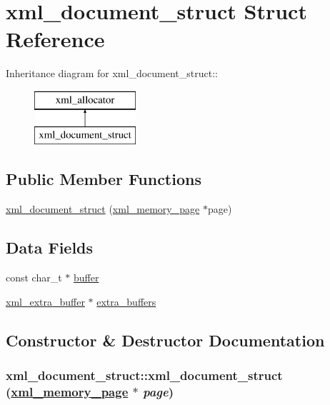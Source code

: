 \hypertarget{structxml__document__struct}{
\section{xml\_\-document\_\-struct Struct Reference}
\label{structxml__document__struct}
}
Inheritance diagram for xml\_\-document\_\-struct::\begin{figure}[H]
\begin{center}
\leavevmode
\includegraphics[height=2cm]{structxml__document__struct}
\end{center}
\end{figure}
\subsection*{Public Member Functions}
\begin{CompactItemize}
\item 
\hyperlink{structxml__document__struct_ea3482436c20abd98ca063c3bd5dcfba}{xml\_\-document\_\-struct} (\hyperlink{structxml__memory__page}{xml\_\-memory\_\-page} $\ast$page)
\end{CompactItemize}
\subsection*{Data Fields}
\begin{CompactItemize}
\item 
const char\_\-t $\ast$ \hyperlink{structxml__document__struct_120451f29b8cc2a82a3ecc926449ea0e}{buffer}
\item 
\hyperlink{structxml__extra__buffer}{xml\_\-extra\_\-buffer} $\ast$ \hyperlink{structxml__document__struct_fe3b1efd5b683c306157244496f55c4b}{extra\_\-buffers}
\end{CompactItemize}


\subsection{Constructor \& Destructor Documentation}
\hypertarget{structxml__document__struct_ea3482436c20abd98ca063c3bd5dcfba}{
\subsubsection[xml\_\-document\_\-struct]{\setlength{\rightskip}{0pt plus 5cm}xml\_\-document\_\-struct::xml\_\-document\_\-struct (\hyperlink{structxml__memory__page}{xml\_\-memory\_\-page} $\ast$ {\em page})}}
\label{structxml__document__struct_ea3482436c20abd98ca063c3bd5dcfba}




